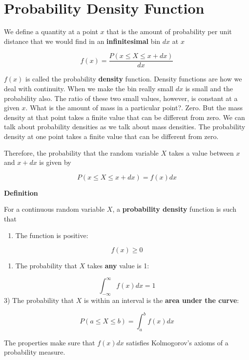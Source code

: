 \documentclass[
]{book}
\providecommand{\tightlist}{%
  \setlength{\itemsep}{0pt}\setlength{\parskip}{0pt}}
\begin{document}
\hypertarget{probability-density-function}{%
\section{Probability Density Function}\label{probability-density-function}}

We define a quantity at a point \(x\) that is the amount of probability per unit distance that we would find in an \textbf{infinitesimal} bin \(dx\) at \(x\)

\[f(x)= \frac{P(x\leq X \leq x+dx)}{dx}\]

\(f(x)\) is called the probability \textbf{density} function. Density functions are how we deal with continuity. When we make the bin really small \(dx\) is small and the probability also. The ratio of these two small values, however, is constant at a given \(x\). What is the amount of mass in a particular point?. Zero. But the mass density at that point takes a finite value that can be different from zero. We can talk about probability densities as we talk about mass densities. The probability density at one point takes a finite value that can be different from zero.

Therefore, the probability that the random variable \(X\) takes a value between \(x\) and \(x+dx\)
is given by

\[P(x\leq X \leq x+dx)= f(x) dx\]

\textbf{Definition}

For a continuous random variable \(X\), a \textbf{probability density} function is such that

\begin{enumerate}
\def\labelenumi{\arabic{enumi})}
\tightlist
\item
  The function is positive:
\end{enumerate}

\[f(x) \geq 0\]

\begin{enumerate}
\def\labelenumi{\arabic{enumi})}
\setcounter{enumi}{1}
\tightlist
\item
  The probability that \(X\) takes \textbf{any} value is 1:
\end{enumerate}

\[\int_{-\infty}^{\infty} f(x) dx = 1\]
3) The probability that \(X\) is within an interval is the \textbf{area under the curve}:

\[P(a\leq X \leq b)=\int_{a}^{b} f(x) dx\]

The properties make sure that \(f(x)dx\) satisfies Kolmogorov's axioms of a probability measure.
\end{document}
